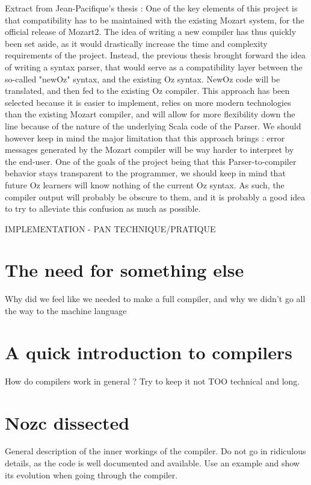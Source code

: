 
Extract from Jean-Pacifique's thesis :
One of the key elements of this project is that compatibility has to be maintained with the existing Mozart system, for the official release of Mozart2.
The idea of writing a new compiler has thus quickly been set aside, as it would drastically increase the time and complexity requirements of the project.
Instead, the previous thesis brought forward the idea of writing a syntax parser, that would serve as a compatibility layer between the so-called "newOz" syntax, and the existing Oz syntax.\cite{jpthesis}
NewOz code will be translated, and then fed to the existing Oz compiler.\newline
This approach has been selected because it is easier to implement, relies on more modern technologies than the existing Mozart compiler, and will allow for more flexibility down the line because of the nature of the underlying Scala code of the Parser.
We should however keep in mind the major limitation that this approach brings : error messages generated by the Mozart compiler will be way harder to interpret by the end-user.
One of the goals of the project being that this Parser-to-compiler behavior stays transparent to the programmer, we should keep in mind that future Oz learners will know nothing of the current Oz syntax.
As such, the compiler output will probably be obscure to them, and it is probably a good idea to try to alleviate this confusion as much as possible.\newline

IMPLEMENTATION - PAN TECHNIQUE/PRATIQUE

\section{The need for something else}\label{sec:ch2WhyCompiler}
Why did we feel like we needed to make a full compiler, and why we didn't go all the way to the machine language

\section{A quick introduction to compilers}\label{sec:ch2WhatIsCompiler}
How do compilers work in general ?
Try to keep it not TOO technical and long.

\section{Nozc dissected}\label{sec:ch2HowCompiler}
General description of the inner workings of the compiler.
Do not go in ridiculous details, as the code is well documented and available.
Use an example and show its evolution when going through the compiler.

